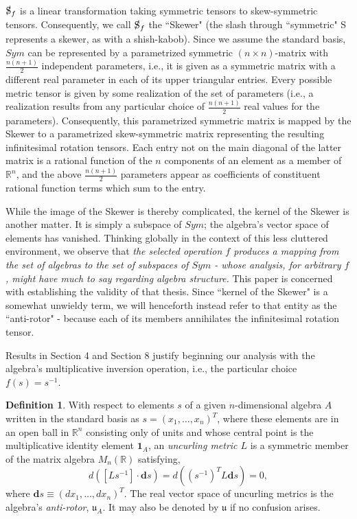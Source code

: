 \documentclass{amsart}
\numberwithin{equation}{section}
\theoremstyle{definition}
\newtheorem{definition}[theorem]{Definition}
\numberwithin{theorem}{section}
\begin{document}
$\slashed{\text{S}}_f$ is a linear transformation taking symmetric tensors to skew-symmetric tensors. Consequently, we call $\slashed{\text{S}}_f$ the ``Skewer" (the slash through ``symmetric" S represents a skewer, as with a shish-kabob). Since we assume the standard basis, $Sym$ can be represented by a parametrized symmetric $(n\times n)$-matrix with $\frac{n(n+1)}{2}$ independent parameters, i.e., it is given as a symmetric matrix with a different real parameter in each of its upper triangular entries.  Every possible metric tensor is given by some realization of the set of parameters (i.e., a realization results from any particular choice of $\frac{n(n+1)}{2}$ real values for the parameters).  Consequently, this parametrized symmetric matrix is mapped by the Skewer to a parametrized skew-symmetric matrix representing the resulting infinitesimal rotation tensors.  Each entry not on the main diagonal of the latter matrix is a rational function of the $n$ components of an element as a member of $\mathbb{R}^n$, and the above $\frac{n(n+1)}{2}$ parameters appear as coefficients of constituent rational function terms which sum to the entry.  

While the image of the Skewer is thereby complicated, the kernel of the Skewer is another matter.  It is simply a subspace of $Sym$;  the algebra's vector space of elements has vanished.  Thinking globally in the context of this less cluttered environment, we observe that
{\it the selected operation $f$ produces a mapping from the set of algebras to the set of subspaces of $Sym$ - whose analysis, for arbitrary $f$, might have much to say regarding algebra structure.}
This paper is concerned with establishing the validity of that thesis. 
  Since ``kernel of the Skewer" is a somewhat unwieldy term, we will henceforth instead refer to that entity as the ``anti-rotor" - because each of its members annihilates the infinitesimal rotation tensor.
  
Results in Section 4 and Section 8 justify beginning our analysis with the algebra's multiplicative inversion operation, i.e., the particular choice $f(s)=s^{-1}$.  

     \begin{definition}\label{7/21/23.1} With respect to elements $s$ of a given $n$-dimensional algebra $A$ written in the standard basis as $s= (x_1,\dots,x_n)^T$, where these elements are in an open ball in $\mathbb{R}^n$ consisting only of units and whose central point is the multiplicative identity element $\mathbf{1}_A$, an {\it uncurling metric $L$} is a symmetric member of the matrix algebra $M_n(\mathbb{R})$  satisfying, \begin{equation}\label{4/7/23.1} d\left([Ls^{-1}]\cdot \mathbf{d}s\right) = d\left((s^{-1})^T L \mathbf{d}s\right) = 0, \end{equation} where $\mathbf{d}s \equiv (dx_1,\dots,dx_n)^T$.  The real vector space of uncurling metrics is the algebra's {\it anti-rotor}, $\mathfrak{u}_A$.  It may also be denoted by $\mathfrak{u}$ if no confusion arises.    \end{definition}
     
\end{document}
